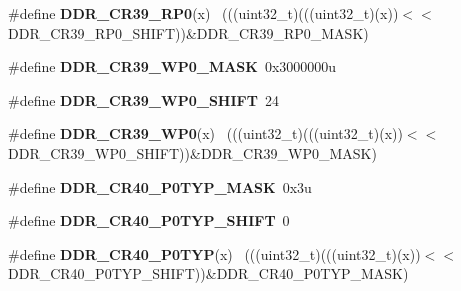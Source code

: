 \begin{DoxyCompactItemize}
\item 
\hypertarget{group___d_d_r___register___masks_ga27bd137811741b9d955b20cb47f18622}{}\#define {\bfseries D\+D\+R\+\_\+\+C\+R39\+\_\+\+R\+P0}(x)                                                ~(((uint32\+\_\+t)(((uint32\+\_\+t)(x))$<$$<$D\+D\+R\+\_\+\+C\+R39\+\_\+\+R\+P0\+\_\+\+S\+H\+I\+F\+T))\&D\+D\+R\+\_\+\+C\+R39\+\_\+\+R\+P0\+\_\+\+M\+A\+S\+K)\label{group___d_d_r___register___masks_ga27bd137811741b9d955b20cb47f18622}

\item 
\hypertarget{group___d_d_r___register___masks_gaf100cdf28bffbb685a017a7564462eb3}{}\#define {\bfseries D\+D\+R\+\_\+\+C\+R39\+\_\+\+W\+P0\+\_\+\+M\+A\+S\+K}~0x3000000u\label{group___d_d_r___register___masks_gaf100cdf28bffbb685a017a7564462eb3}

\item 
\hypertarget{group___d_d_r___register___masks_ga0ce81b6acd65e8fc664d2f433e9743d4}{}\#define {\bfseries D\+D\+R\+\_\+\+C\+R39\+\_\+\+W\+P0\+\_\+\+S\+H\+I\+F\+T}~24\label{group___d_d_r___register___masks_ga0ce81b6acd65e8fc664d2f433e9743d4}

\item 
\hypertarget{group___d_d_r___register___masks_ga73e6a8f2aeefbcd7e043f88459209c50}{}\#define {\bfseries D\+D\+R\+\_\+\+C\+R39\+\_\+\+W\+P0}(x)                                                ~(((uint32\+\_\+t)(((uint32\+\_\+t)(x))$<$$<$D\+D\+R\+\_\+\+C\+R39\+\_\+\+W\+P0\+\_\+\+S\+H\+I\+F\+T))\&D\+D\+R\+\_\+\+C\+R39\+\_\+\+W\+P0\+\_\+\+M\+A\+S\+K)\label{group___d_d_r___register___masks_ga73e6a8f2aeefbcd7e043f88459209c50}

\item 
\hypertarget{group___d_d_r___register___masks_ga781e071528d8b3fbbe5cba4818d93cbd}{}\#define {\bfseries D\+D\+R\+\_\+\+C\+R40\+\_\+\+P0\+T\+Y\+P\+\_\+\+M\+A\+S\+K}~0x3u\label{group___d_d_r___register___masks_ga781e071528d8b3fbbe5cba4818d93cbd}

\item 
\hypertarget{group___d_d_r___register___masks_gabb019add0b2a25d440a6066f1ac80b70}{}\#define {\bfseries D\+D\+R\+\_\+\+C\+R40\+\_\+\+P0\+T\+Y\+P\+\_\+\+S\+H\+I\+F\+T}~0\label{group___d_d_r___register___masks_gabb019add0b2a25d440a6066f1ac80b70}

\item 
\hypertarget{group___d_d_r___register___masks_gaa314a075f53607752f436dd5601f6851}{}\#define {\bfseries D\+D\+R\+\_\+\+C\+R40\+\_\+\+P0\+T\+Y\+P}(x)                                            ~(((uint32\+\_\+t)(((uint32\+\_\+t)(x))$<$$<$D\+D\+R\+\_\+\+C\+R40\+\_\+\+P0\+T\+Y\+P\+\_\+\+S\+H\+I\+F\+T))\&D\+D\+R\+\_\+\+C\+R40\+\_\+\+P0\+T\+Y\+P\+\_\+\+M\+A\+S\+K)\label{group___d_d_r___register___masks_gaa314a075f53607752f436dd5601f6851}


\end{DoxyCompactItemize}
